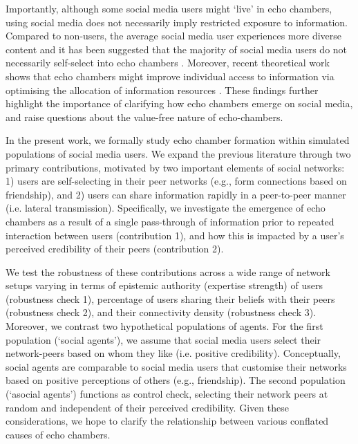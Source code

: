 \documentclass[fleqn,10pt]{wlscirep}
\begin{document}
Importantly, although some social media users might `live' in echo chambers, using social media does not necessarily imply restricted exposure to information. Compared to non-users, the average social media user experiences more diverse content \cite{newman2017reuters} and it has been suggested that the majority of social media users do not necessarily self-select into echo chambers \cite{haw2020drives}. Moreover, recent theoretical work shows that echo chambers might improve individual access to information via optimising the allocation of information resources \cite{jann2018echo}. These findings further highlight the importance of clarifying how echo chambers emerge on social media, and raise questions about the value-free nature of echo-chambers. %

In the present work, we formally study echo chamber formation within simulated populations of social media users. We expand the previous literature through two primary contributions, motivated by two important elements of social networks: 1) users are self-selecting in their peer networks (e.g., form connections based on friendship), and 2) users can share information rapidly in a peer-to-peer manner (i.e. lateral transmission). Specifically, we investigate the emergence of echo chambers as a result of a single pass-through of information prior to repeated interaction between users (contribution 1), and how this is impacted by a user's perceived credibility of their peers (contribution 2). 

We test the robustness of these contributions across a wide range of network setups varying in terms of epistemic authority (expertise strength) of users (robustness check 1), percentage of users sharing their beliefs with their peers (robustness check 2), and their connectivity density (robustness check 3). Moreover, we contrast two hypothetical populations of agents. For the first population (`social agents'), we assume that social media users select their network-peers based on whom they like (i.e. positive credibility). Conceptually, social agents are comparable to social media users that customise their networks based on positive perceptions of others (e.g., friendship). The second population (`asocial agents') functions as control check, selecting their network peers at random and independent of their perceived credibility. Given these considerations, we hope to clarify the relationship between various conflated causes of echo chambers. 
\end{document}

